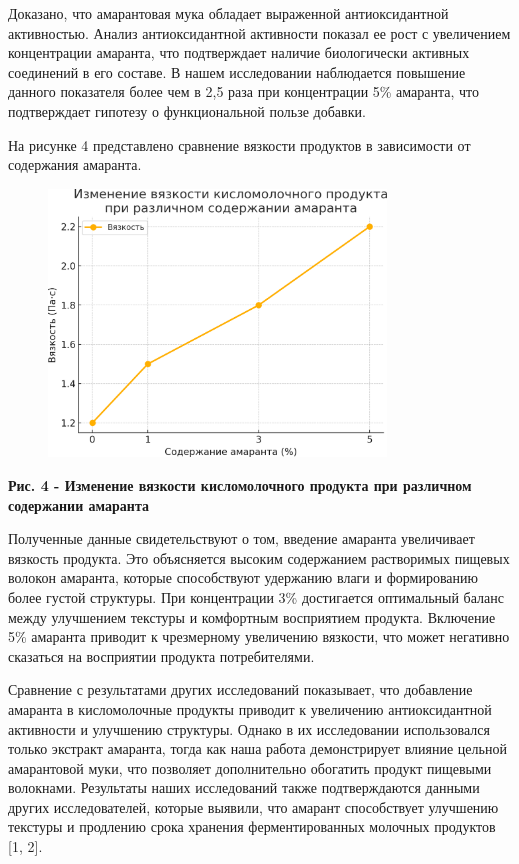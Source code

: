 {Доказано, что амарантовая мука обладает выраженной антиоксидантной
активностью. Анализ антиоксидантной активности показал ее рост с
увеличением концентрации амаранта, что подтверждает наличие биологически
активных соединений в его составе. В нашем исследовании наблюдается
повышение данного показателя более чем в 2,5 раза при концентрации 5\%
амаранта, что подтверждает гипотезу о функциональной пользе добавки.

На рисунке 4 представлено сравнение вязкости продуктов в зависимости от
содержания амаранта.

\begin{figure}[H]
	\centering
	\includegraphics[width=0.8\textwidth]{media/pish2/image23}
	\caption*{}
\end{figure}


{\bfseries Рис. 4 - Изменение вязкости кисломолочного продукта при
различном содержании амаранта}

Полученные данные свидетельствуют о том, введение амаранта увеличивает
вязкость продукта. Это объясняется высоким содержанием растворимых
пищевых волокон амаранта, которые способствуют удержанию влаги и
формированию более густой структуры. При концентрации 3\% достигается
оптимальный баланс между улучшением текстуры и комфортным восприятием
продукта. Включение 5\% амаранта приводит к чрезмерному увеличению
вязкости, что может негативно сказаться на восприятии продукта
потребителями.

Сравнение с результатами других исследований показывает, что добавление
амаранта в кисломолочные продукты приводит к увеличению антиоксидантной
активности и улучшению структуры. Однако в их исследовании использовался
только экстракт амаранта, тогда как наша работа демонстрирует влияние
цельной амарантовой муки, что позволяет дополнительно обогатить продукт
пищевыми волокнами. Результаты наших исследований также подтверждаются
данными других исследователей, которые выявили, что амарант способствует
улучшению текстуры и продлению срока хранения ферментированных молочных
продуктов {[}1, 2{]}.

}
